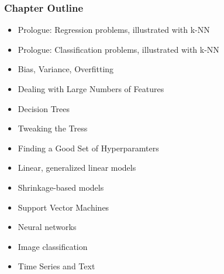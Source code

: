 \documentclass{beamer}
\begin{document}
\begin{frame} 
\frametitle{Chapter Outline}

\begin{itemize}

\item Prologue: Regression problems, illustrated with k-NN

\item Prologue: Classification problems, illustrated with k-NN

\item Bias, Variance, Overfitting

\item Dealing with Large Numbers of Features

\item Decision Trees

\item Tweaking the Tress

\item Finding a Good Set of Hyperparamters

\item Linear, generalized linear models

\item Shrinkage-based models

\item Support Vector Machines

\item Neural networks

\item Image classification

\item Time Series and Text

\end{itemize} 

\end{frame} 
\end{document}
